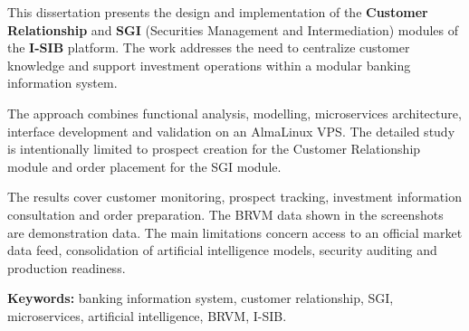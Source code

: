 \hspace{0.5cm}
This dissertation presents the design and implementation of the \textbf{Customer
Relationship} and \textbf{SGI} (Securities Management and Intermediation)
modules of the \textbf{I-SIB} platform. The work addresses the need to centralize
customer knowledge and support investment operations within a modular banking
information system.

\hspace{0.5cm}
The approach combines functional analysis, modelling, microservices architecture,
interface development and validation on an AlmaLinux VPS. The detailed study is
intentionally limited to prospect creation for the Customer Relationship module
and order placement for the SGI module.

\hspace{0.5cm}
The results cover customer monitoring, prospect tracking, investment information
consultation and order preparation. The BRVM data shown in the screenshots are
demonstration data. The main limitations concern access to an official market
data feed, consolidation of artificial intelligence models, security auditing
and production readiness.

\vspace{0.25cm}
\noindent
\textbf{Keywords:} banking information system, customer relationship, SGI,
microservices, artificial intelligence, BRVM, I-SIB.
\endgroup
